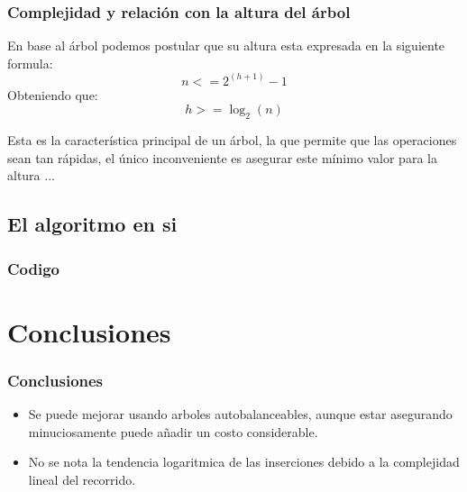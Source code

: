 \documentclass{beamer}
\begin{document}
		\begin{frame}
			\frametitle{Complejidad y relación con la altura del árbol}
			En base al árbol podemos postular que su altura esta expresada en la siguiente formula:
				\begin{equation}
					n < = 2^{(h + 1)} - 1
				\end{equation}
				Obteniendo que:
				\begin{equation}
					h >= \log_2{(n)}
				\end{equation}
				
			Esta es la característica principal de un árbol, la que permite que las operaciones sean tan rápidas, el único inconveniente es asegurar este mínimo valor para la altura ...
		\end{frame}

		\subsection{El algoritmo en si}

			\begin{frame}
				\frametitle{Codigo}
				
			\end{frame}

\section{Conclusiones}

	\begin{frame}
		\frametitle{Conclusiones}
			\begin{itemize}[<+->]
				\item Se puede mejorar usando arboles autobalanceables, aunque estar asegurando minuciosamente puede añadir un costo considerable.
				\item No se nota la tendencia logaritmica de las inserciones debido a la complejidad lineal del recorrido.
			\end{itemize}
	\end{frame}
\end{document}
